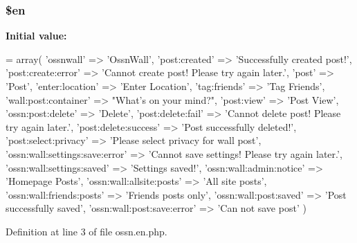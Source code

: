 \subsubsection[{\texorpdfstring{\$en}{$en}}]{\setlength{\rightskip}{0pt plus 5cm}\$en}\hypertarget{components_2_ossn_wall_2locale_2ossn_8en_8php_a48abc714dfb71c8fffa83cf49f452115}{}\label{components_2_ossn_wall_2locale_2ossn_8en_8php_a48abc714dfb71c8fffa83cf49f452115}
{\bfseries Initial value\+:}
\begin{DoxyCode}
= array(
        \textcolor{stringliteral}{'ossnwall'} => \textcolor{stringliteral}{'OssnWall'},
        \textcolor{stringliteral}{'post:created'} => \textcolor{stringliteral}{'Successfully created post!'},
        \textcolor{stringliteral}{'post:create:error'} => \textcolor{stringliteral}{'Cannot create post! Please try again later.'},
        \textcolor{stringliteral}{'post'} => \textcolor{stringliteral}{'Post'},
        \textcolor{stringliteral}{'enter:location'} => \textcolor{stringliteral}{'Enter Location'},
        \textcolor{stringliteral}{'tag:friends'} => \textcolor{stringliteral}{'Tag Friends'},
        \textcolor{stringliteral}{'wall:post:container'} => \textcolor{stringliteral}{"What's on your mind?"},
        \textcolor{stringliteral}{'post:view'} => \textcolor{stringliteral}{'Post View'},
        \textcolor{stringliteral}{'ossn:post:delete'} => \textcolor{stringliteral}{'Delete'},
        \textcolor{stringliteral}{'post:delete:fail'} => \textcolor{stringliteral}{'Cannot delete post! Please try again later.'},
        \textcolor{stringliteral}{'post:delete:success'} => \textcolor{stringliteral}{'Post successfully deleted!'},
        \textcolor{stringliteral}{'post:select:privacy'} => \textcolor{stringliteral}{'Please select privacy for wall post'},
        \textcolor{stringliteral}{'ossn:wall:settings:save:error'} => \textcolor{stringliteral}{'Cannot save settings! Please try again later.'},
        \textcolor{stringliteral}{'ossn:wall:settings:saved'} => \textcolor{stringliteral}{'Settings saved!'},
        \textcolor{stringliteral}{'ossn:wall:admin:notice'} => \textcolor{stringliteral}{'Homepage Posts'},
        \textcolor{stringliteral}{'ossn:wall:allsite:posts'} => \textcolor{stringliteral}{'All site posts'},
        \textcolor{stringliteral}{'ossn:wall:friends:posts'} => \textcolor{stringliteral}{'Friends posts only'},
        \textcolor{stringliteral}{'ossn:wall:post:saved'} => \textcolor{stringliteral}{'Post successfully saved'},
        \textcolor{stringliteral}{'ossn:wall:post:save:error'} => \textcolor{stringliteral}{'Can not save post'}
)
\end{DoxyCode}


Definition at line 3 of file ossn.\+en.\+php.

